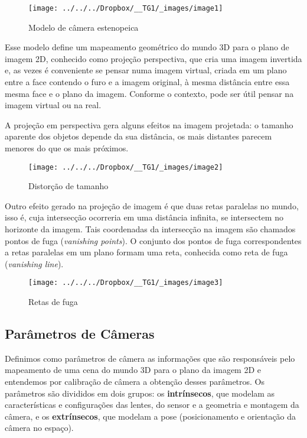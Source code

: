 \documentclass[ecp,tc]{iiufrgs}
\begin{document}
\begin{figure}
\centering
\caption{Modelo de câmera estenopeica}
\texttt{[image: ../../../Dropbox/\_\_TG1/\_images/image1]}
\label{fig:image1}
\end{figure}

Esse modelo define um mapeamento geométrico do mundo 3D para o plano de imagem 2D, conhecido como projeção perspectiva, que cria uma imagem invertida e, as vezes é conveniente se pensar numa imagem virtual, criada em um plano entre a face contendo o furo e a imagem original, à mesma distância entre essa mesma face e o plano da imagem. Conforme o contexto, pode ser útil pensar na imagem virtual ou na real.

A projeção em perspectiva gera alguns efeitos na imagem projetada: o tamanho aparente dos objetos depende da sua distância, os mais distantes parecem menores do que os mais próximos.

\begin{figure}
	\centering
	\caption{Distorção de tamanho}
	\texttt{[image: ../../../Dropbox/\_\_TG1/\_images/image2]}
	\label{fig:image2}
\end{figure}

Outro efeito gerado na projeção de imagem é que duas retas paralelas no mundo, isso é, cuja intersecção ocorreria em uma distância infinita, se intersectem no horizonte da imagem. Tais coordenadas da intersecção na imagem são chamados pontos de fuga (\textit{vanishing points}). O conjunto dos pontos de fuga correspondentes a retas paralelas em um plano formam uma reta, conhecida como reta de fuga (\textit{vanishing line}).

\begin{figure}
	\centering
	\caption{Retas de fuga}
	\texttt{[image: ../../../Dropbox/\_\_TG1/\_images/image3]}
	\label{fig:image3}
\end{figure}

\subsection{Parâmetros de Câmeras}
Definimos como parâmetros de câmera as informações que são responsáveis pelo mapeamento de uma cena do mundo 3D para o plano da imagem 2D e entendemos por calibração de câmera a obtenção desses parâmetros. Os parâmetros são divididos em dois grupos: os \textbf{intrínsecos}, que modelam as características e configurações das lentes, do sensor e a geometria e montagem da câmera, e os \textbf{extrínsecos}, que modelam a pose (posicionamento e orientação da câmera no espaço).
\end{document}
